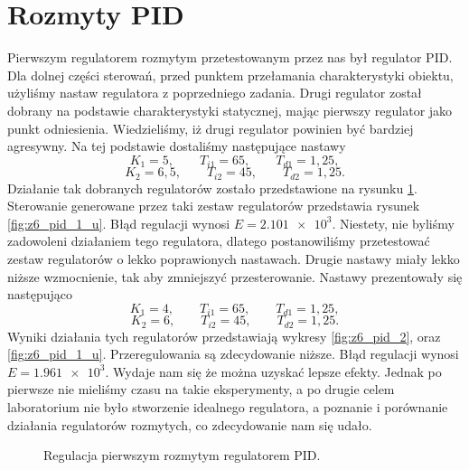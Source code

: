 \section{Rozmyty PID}
Pierwszym regulatorem rozmytym przetestowanym przez nas był regulator PID.
Dla dolnej części sterowań, przed punktem przełamania charakterystyki obiektu,
użyliśmy nastaw regulatora z poprzedniego zadania. Drugi regulator został dobrany
na podstawie charakterystyki statycznej, mając pierwszy regulator jako punkt odniesienia.
Wiedzieliśmy, iż drugi regulator powinien być bardziej agresywny.
Na tej podstawie dostaliśmy następujące nastawy
\begin{equation}
  K_1 = 5, \qquad T_{i1} = 65, \qquad T_{d1} = 1,25,
\end{equation}
\begin{equation}
  K_2 = 6,5, \qquad T_{i2} = 45, \qquad T_{d2} = 1,25.
\end{equation}
Działanie tak dobranych regulatorów zostało przedstawione na rysunku \ref{fig:z6_pid_1}.
Sterowanie generowane przez taki zestaw regulatorów przedstawia rysunek \ref{fig:z6_pid_1_u}. Błąd regulacji wynosi $E=\num{2,101e+3}$.
Niestety, nie byliśmy zadowoleni działaniem tego regulatora, dlatego postanowiliśmy
przetestować zestaw regulatorów o lekko poprawionych nastawach.
Drugie nastawy miały lekko niższe wzmocnienie, tak aby zmniejszyć przesterowanie.
Nastawy prezentowały się następująco
\begin{equation}
  K_1 = 4, \qquad T_{i1} = 65, \qquad T_{d1} = 1,25,
\end{equation}
\begin{equation}
  K_2 = 6, \qquad T_{i2} = 45, \qquad T_{d2} = 1,25.
\end{equation}
Wyniki działania tych regulatorów przedstawiają wykresy \ref{fig:z6_pid_2}, oraz
\ref{fig:z6_pid_1_u}. Przeregulowania są zdecydowanie niższe. Błąd regulacji wynosi $E=\num{1,961e+3}$. Wydaje nam się
że można uzyskać lepsze efekty. Jednak po pierwsze nie mieliśmy czasu na takie eksperymenty,
a po drugie celem laboratorium nie było stworzenie idealnego regulatora, a
poznanie i porównanie działania regulatorów rozmytych, co zdecydowanie nam się udało.

\begin{figure}[tb]
\centering
{}
\caption{Regulacja pierwszym rozmytym regulatorem PID.}
\label{fig:z6_pid_1}
\end{figure}

